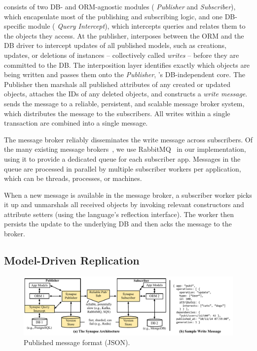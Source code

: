 \synapse consists of two DB- and ORM-agnostic modules ({\em \synapse
Publisher} and {\em \synapse Subscriber}), which encapsulate most of the
publishing and subscribing logic, and one DB-specific module ({\em \synapse
Query Intercept}), which intercepts queries and relates them to the objects they
access. At the publisher, \synapse interposes between the ORM and the DB
driver to intercept updates of all published models, such as creations, updates,
or deletions of instances -- collectively called {\em writes} -- before they are
committed to the DB. The interposition layer identifies exactly which objects
are being written and passes them onto the {\em \synapse Publisher},
\synapse's DB-independent core. The Publisher then marshals all published
attributes of any created or updated objects, attaches the IDs of any deleted
objects, and constructs a {\em write message}. \synapse sends the message to a
reliable, persistent, and scalable message broker system, which distributes the
message to the subscribers. All writes within a single transaction are combined
into a single message.

The message broker reliably disseminates the write message across subscribers.
Of the many existing message brokers~\cite{jms,kafka,rabbitmq},
we use RabbitMQ~\cite{rabbitmq} in our implementation, using it to provide a
dedicated queue for each subscriber app. Messages in the queue are processed in
parallel by multiple subscriber workers per application, which can be threads,
processes, or machines.

When a new message is available in the message broker, a \synapse subscriber
worker picks it up and unmarshals all received objects by invoking relevant
constructors and attribute setters (using the language's reflection interface).
The worker then persists the update to the underlying DB and then acks the
message to the broker.


\subsection{Model-Driven Replication}
\label{synapse:sec:arch:cross-db-propagation}


\begin{figure}[t]
 \centering
 \includegraphics[width=.45\linewidth,clip=true,trim=5in 0.4in 0 0]{figures/synapse/architecture-less-detail.pdf}
 \caption{{Published message format (JSON).}}
 \label{synapse:fig:json}
\end{figure}


